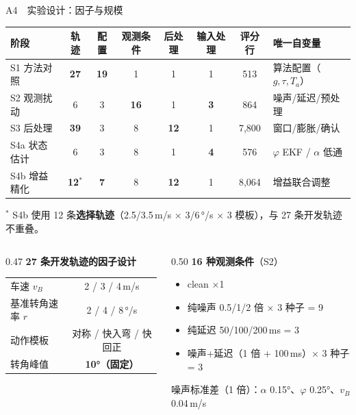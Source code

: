 \documentclass[aspectratio=169,10pt]{ctexbeamer}
\begin{document}
\begin{frame}{A4\ \ 实验设计：因子与规模}
  \scriptsize
  \renewcommand{\arraystretch}{1.32}
  \begin{center}
  \begin{tabular}{@{}lccccccl@{}}
    \toprule
    \textbf{阶段} & \textbf{轨迹} & \textbf{配置} & \textbf{观测条件} & \textbf{后处理} & \textbf{输入处理} & \textbf{评分行} & \textbf{唯一自变量} \\
    \midrule
    S1 方法对照 & \textbf{27} & \textbf{19} & 1 & 1 & 1 & 513 & 算法配置（$g,\tau,T_a$）\\
    S2 观测扰动 & 6 & 3 & \textbf{16} & 1 & \textbf{3} & 864 & 噪声/延迟/预处理\\
    S3 后处理 & \textbf{39} & 3 & 8 & \textbf{12} & 1 & 7{,}800 & 窗口/膨胀/确认\\
    S4a 状态估计 & 6 & 3 & 8 & 1 & \textbf{4} & 576 & $\varphi$ EKF / $\alpha$ 低通\\
    S4b 增益精化 & \textbf{12}$^{*}$ & \textbf{7} & 8 & \textbf{12} & 1 & 8{,}064 & 增益联合调整\\
    \bottomrule
  \end{tabular}
  \end{center}
  {\tiny $^{*}$ S4b 使用 12 条\textbf{选择轨迹}（2.5/3.5\,m/s × 3/6\,°/s × 3 模板），与 27 条开发轨迹不重叠。}

  \vspace{0.5em}
  \begin{columns}[T]
    \begin{column}{0.47\textwidth}
      \textbf{27 条开发轨迹的因子设计}
      \begin{center}
      \begin{tabular}{@{}lc@{}}
        \toprule
        车速 $v_B$ & 2 / 3 / 4\,m/s \\
        基准转角速率 $r$ & 2 / 4 / 8\,°/s \\
        动作模板 & 对称 / 快入弯 / 快回正 \\
        转角峰值 & \textbf{10°（固定）}\\
        \bottomrule
      \end{tabular}
      \end{center}
    \end{column}
    \begin{column}{0.50\textwidth}
      \textbf{16 种观测条件}（S2）
      \begin{itemize}\tiny\setlength{\itemsep}{0pt}
        \item clean ×1
        \item 纯噪声 0.5/1/2 倍 × 3 种子 = 9
        \item 纯延迟 50/100/200\,ms = 3
        \item 噪声+延迟（1 倍 + 100\,ms）× 3 种子 = 3
      \end{itemize}
      \vspace{0.2em}
      {\tiny 噪声标准差（1 倍）：$\alpha$ 0.15°、$\varphi$ 0.25°、$v_B$ 0.04\,m/s}
    \end{column}
  \end{columns}
\end{frame}
\end{document}
